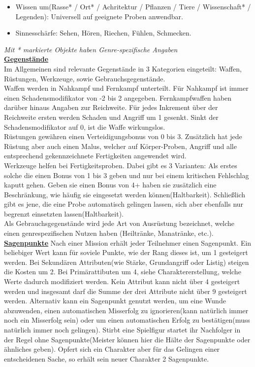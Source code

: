 \documentclass[twoside,a4paper]{minimal}
\begin{document}
\begin{multicols*}{3}
\begin{itemize}
\item Wissen um(Rasse* / Ort* / Achritektur / Pflanzen / Tiere / Wissenschaft* / Legenden): Universell auf geeignete Proben anwendbar.
\item Sinnesschärfe: Sehen, Hören, Riechen, Fühlen, Schmecken.
\end{itemize}
\textit{Mit * markierte Objekte haben Genre-spezifische Angaben}
\textbf{\uline{\\Gegenstände}}
\\Im Allgemeinen sind relevante Gegenstände in 3 Kategorien eingeteilt: Waffen, Rüstungen, Werkzeuge, sowie Gebrauchsgegenstände.
\\Waffen werden in Nahkampf und Fernkampf unterteilt. Für Nahkampf ist immer einen Schadensmodifikator von -2 bis 2 angegeben. Fernkampfwaffen haben darüber hinaus Angaben zur Reichweite. Für jedes Inkrement über der Reichweite ersten werden Schaden und Angriff um 1 gesenkt. Sinkt der Schadensmodifikator auf 0, ist die Waffe wirkungslos.
\\Rüstungen gewähren einen Verteidigungsbonus von 0 bis 3. Zusätzlich hat jede Rüstung aber auch einen Malus, welcher auf Körper-Proben, Angriff und alle entsprechend gekennzeichnete Fertigkeiten angewendet wird.
\\Werkzeuge helfen bei Fertigkeitsproben. Dabei gibt es 3 Varianten: Als erstes solche die einen Bonus von 1 bis 3 geben und nur bei einem kritischen Fehlschlag kaputt gehen. Geben sie einen Bonus von 4+ haben sie zusätzlich eine Beschränkung, wie häufig sie eingesetzt werden können(Haltbarkeit). Schließlich gibt es jene, die eine Probe automatisch gelingen lassen, sich aber ebenfalls nur begrenzt einsetzten lassen(Haltbarkeit).
\\Als Gebrauchsgegenstände wird jede Art von Ausrüstung bezeichnet, welche einen genrespezifischen Nutzen haben (Heiltränke, Manatränke, etc.).
\textbf{\uline{\\Sagenpunkte}}
Nach einer Mission erhält jeder Teilnehmer einen Sagenpunkt. Ein beliebiger Wert kann für soviele Punkte, wie der Rang dieses ist, um 1 gesteigert werden. Bei Sekundären Attributen(wie Stärke, Grundangriff oder Listig) steigen die Kosten um 2. Bei Primärattibuten um 4, siehe Charaktererstellung, welche Werte dadurch modifiziert werden. Kein Attribut kann nicht über 4 gesteigert werden und insgesamt darf die Summe der drei Attribute nicht über 9 gesteigert werden. Alternativ kann ein Sagenpunkt genutzt werden, um eine Wunde abzuwenden, einen automatischen Misserfolg zu ignorieren(kann natürlich immer noch ein Misserfolg sein) oder um einen automatischen Erfolg zu bestätigen(muss natürlich immer noch gelingen). Stirbt eine Spielfigur startet ihr Nachfolger in der Regel ohne Sagenpunkte(Meister können hier die Hälte der Sagenpunkte oder ähnliches geben). Opfert sich ein Charakter aber für das Gelingen einer entscheidenen Sache, so erhält sein neuer Charakter 2 Sagenpunkte. 

\end{multicols*}
\end{document}
